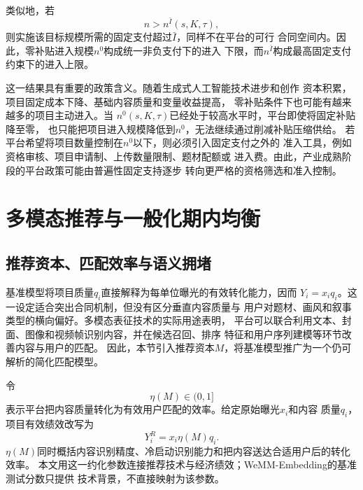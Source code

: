 \documentclass[UTF8, a4paper, 12pt, fontset=fandol]{ctexart}
\theoremstyle{definition}
\theoremstyle{remark}
\begin{document}
类似地，若
\begin{equation*}
  n>n^{\bar I}(s,K,\tau),
\end{equation*}
则实施该目标规模所需的固定支付超过$\bar I$，同样不在平台的可行
合同空间内。因此，零补贴进入规模$n^0$构成统一非负支付下的进入
下限，而$n^{\bar I}$构成最高固定支付约束下的进入上限。

这一结果具有重要的政策含义。随着生成式人工智能技术进步和创作
资本积累，项目固定成本下降、基础内容质量和变量收益提高，
零补贴条件下也可能有越来越多的项目主动进入。当
$n^0(s,K,\tau)$已经处于较高水平时，平台即使将固定补贴降至零，
也只能把项目进入规模降低到$n^0$，无法继续通过削减补贴压缩供给。
若平台希望将项目数量控制在$n^0$以下，则必须引入固定支付之外的
准入工具，例如资格审核、项目申请制、上传数量限制、题材配额或
进入费。由此，产业成熟阶段的平台政策可能由普遍性固定支持逐步
转向更严格的资格筛选和准入控制。
\section{多模态推荐与一般化期内均衡}
\label{sec:dynamic-rec}

\subsection{推荐资本、匹配效率与语义拥堵}
基准模型将项目质量$q_i$直接解释为每单位曝光的有效转化能力，因而
$Y_i=x_iq_i$。这一设定适合突出合同机制，但没有区分垂直内容质量与
用户对题材、画风和叙事类型的横向偏好。多模态表征技术的实际用途表明，
平台可以联合利用文本、封面、图像和视频帧识别内容，并在候选召回、排序
特征和用户序列建模等环节改善内容与用户的匹配\citep{zhou2026wemm}。
因此，本节引入推荐资本$M$，将基准模型推广为一个仍可解析的简化匹配模型。

令
\begin{equation*}
  \eta(M)\in(0,1]
\end{equation*}
表示平台把内容质量转化为有效用户匹配的效率。给定原始曝光$x_i$和内容
质量$q_i$，项目有效绩效改写为
\begin{equation}
  Y_i^R=x_i\eta(M)q_i.
  \label{eq:推荐匹配绩效}
\end{equation}
$\eta(M)$同时概括内容识别精度、冷启动识别能力和把内容送达合适用户后的转化效率。
本文用这一约化参数连接推荐技术与经济绩效；WeMM-Embedding的基准测试分数只提供
技术背景，不直接映射为该参数。
\end{document}
